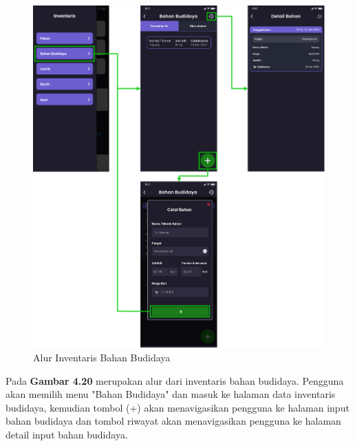 \begin{spacing}{1.5}
	\begin{figure}[H]
		\centering
		\includegraphics[width=1\textwidth]{gambar/sprint2/flow_materials.png}
		\caption{Alur Inventaris Bahan Budidaya}
	\end{figure}

	Pada \textbf{Gambar 4.20} merupakan alur dari inventaris bahan budidaya. Pengguna akan memilih menu "Bahan Budidaya" dan masuk ke halaman data inventaris budidaya, kemudian tombol (+) akan menavigasikan pengguna ke halaman input bahan budidaya dan tombol riwayat akan menavigasikan pengguna ke halaman detail input bahan budidaya.


\end{spacing}
